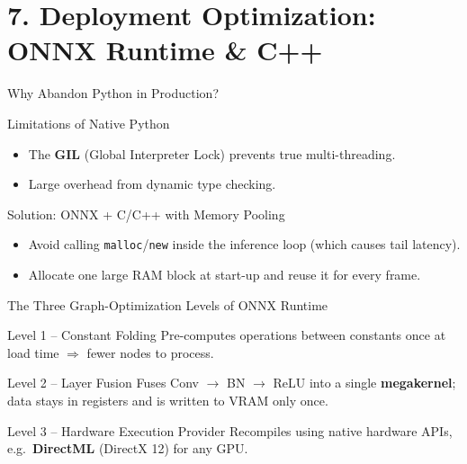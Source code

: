 \documentclass[aspectratio=169]{beamer}
\begin{document}
\section{7. Deployment Optimization: ONNX Runtime \& C++}
\begin{frame}{Why Abandon Python in Production?}
    \begin{alertblock}{Limitations of Native Python}
        \begin{itemize}
            \item The \textbf{GIL} (Global Interpreter Lock) prevents true multi-threading.
            \item Large overhead from dynamic type checking.
        \end{itemize}
    \end{alertblock}
    \vspace{0.3cm}
    \begin{exampleblock}{Solution: ONNX + C/C++ with Memory Pooling}
        \begin{itemize}
            \item Avoid calling \texttt{malloc}/\texttt{new} inside the inference loop (which causes tail latency).
            \item Allocate one large RAM block at start-up and reuse it for every frame.
        \end{itemize}
    \end{exampleblock}
\end{frame}

\begin{frame}{The Three Graph-Optimization Levels of ONNX Runtime}
    \begin{block}{Level 1 -- Constant Folding}
        Pre-computes operations between constants once at load time $\Rightarrow$ fewer nodes to process.
    \end{block}
    \begin{block}{Level 2 -- Layer Fusion}
        Fuses Conv $\to$ BN $\to$ ReLU into a single \textbf{megakernel}; data stays in registers and is written to VRAM only once.
    \end{block}
    \begin{block}{Level 3 -- Hardware Execution Provider}
        Recompiles using native hardware APIs, e.g.\ \textbf{DirectML} (DirectX 12) for any GPU.
    \end{block}
\end{frame}
\end{document}
